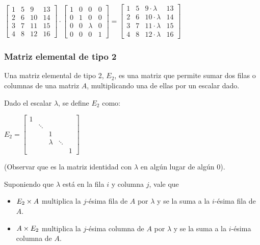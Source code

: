 \documentclass[]{article}
\begin{document}
\begin{center}
	$\begin{bmatrix}
		1&5&9&13 \\
		2&6&10&14 \\
		3&7&11&15 \\
		4&8&12&16
	\end{bmatrix} \cdot
	\begin{bmatrix}
			1&0&0&0 \\
			0&1&0&0 \\
			0&0&\lambda&0 \\
			0&0&0&1
		\end{bmatrix} =
	\begin{bmatrix}
		1&5&9\cdot\lambda&13 \\
		2&6&10\cdot\lambda&14 \\
		3&7&11\cdot\lambda&15 \\
		4&8&12\cdot\lambda&16
	\end{bmatrix}
	$
\end{center}


\subsubsection{Matriz elemental de tipo 2}
Una matriz elemental de tipo 2, $E_2$, es una matriz que permite sumar dos filas o columnas de una matriz $A$, multiplicando una de ellas por un escalar dado.

Dado el escalar $\lambda$, se define $E_2$ como:
\begin{center}
	$E_2 = \begin{bmatrix}
		1 & & & & \\
		& \ddots & & & \\
		& & 1 & & \\
		& & \lambda & \ddots & \\
		& & & & 1
	\end{bmatrix}$
\end{center}

(Observar que es la matriz identidad con $\lambda$ en algún lugar de algún $0$).

Suponiendo que $\lambda$ está en la fila $i$ y columna $j$, vale que
\begin{itemize}
	\item $E_2 \times A$ multiplica la $j$-ésima fila de $A$ por $\lambda$ y se la suma a la $i$-ésima fila de $A$.
	\item $A \times E_2$ multiplica la $j$-ésima columna de $A$ por $\lambda$ y se la suma a la $i$-ésima columna de $A$.
\end{itemize}
\end{document}
